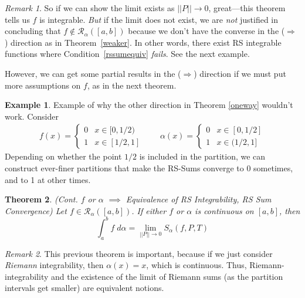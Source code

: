 \documentclass[12pt]{book}
\numberwithin{equation}{section} %
\theoremstyle{plain}
\newtheorem{thm}{Theorem}[section]
\theoremstyle{definition}
\newtheorem{ex}[thm]{Example}
\theoremstyle{remark}
\newtheorem*{rmk}{Remark}
\newcommand{\sR}{\mathscr{R}}
\begin{document}
\begin{rmk}
So if we can show the limit exists as $||P||\rightarrow 0$, great---this
theorem tells us $f$ is integrable.
\emph{But} if the limit does not exist, we are \emph{not} justified in
concluding that $f\not\in\sR_\alpha([a,b])$ because we don't have the
converse in the ($\Rightarrow$) direction as in Theorem~\ref{weaker}.
In other words, there exist RS integrable functions where
Condition~\ref{rssumequiv} \emph{fails}. See the next example.

However, we can get some partial results in the ($\Rightarrow$)
direction if we must put more assumptions on $f$, as in the next
theorem.
\end{rmk}

\begin{ex}
Example of why the other direction in Theorem \ref{oneway} wouldn't
work. Consider
\begin{align*}
  f(x) = \begin{cases} 0 & x \in [0, 1/2) \\ 1 & x \in [1/2, 1]
        \end{cases}  \qquad
    \alpha(x) = \begin{cases} 0 & x \in [0,1/2] \\ 1& x\in(1/2, 1]
        \end{cases}
\end{align*}
Depending on whether the point $1/2$ is included in the partition, we
can construct ever-finer partitions that make the RS-Sums converge to 0
sometimes, and to 1 at other times.
\end{ex}

\begin{thm}
\emph{(Cont. $f$ or $\alpha$ $\implies$ Equivalence of RS Integrability,
RS Sum Convergence)}
Let $f\in\mathscr{R}_\alpha([a,b])$. If either $f$ or $\alpha$ is
continuous on $[a,b]$, then
\begin{equation}
    \label{limsum.toprove}
    \int^b_a f\;d\alpha = \lim_{||P||\rightarrow 0}
    S_\alpha(f,P,T)
\end{equation}
\end{thm}
\begin{rmk}
This previous theorem is important, because if we just consider \emph{Riemann} integrability, then $\alpha(x) = x$, which is continuous. Thus, Riemann-integrability and the existence of the limit of Riemann sums (as the partition intervals get smaller) are equivalent notions.
\end{rmk}
\end{document}
